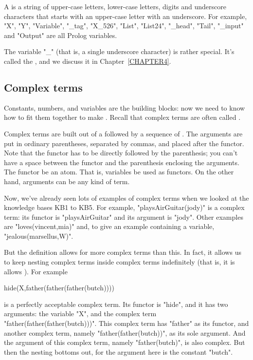 A  is a string of upper-case letters, lower-case letters,
digits and underscore characters that starts  with an
upper-case letter  with an underscore.  For example, "X",
"Y", "Variable", "\_tag", "X\_526",  "List", "List24", "\_head",
"Tail", "\_input" and "Output" are all Prolog variables.

The variable "\_" (that is, a single underscore character) is rather
special.  It's called the , and we discuss
it in Chapter~\ref{CHAPTER4}.



\subsection*{Complex terms}\label{SUBSEC.L1.COMPLEX.TERMS}

Constants, numbers, and variables are the building blocks: now we need
to know how to fit them together to make .
Recall that complex terms are often called .

Complex terms are built out of a  followed by a
sequence of . The arguments are put in ordinary
parentheses, separated by commas, and placed after the functor. Note
that the functor has to be directly followed by the parenthesis; you
can't have a space between the functor and the parenthesis enclosing
the arguments. The functor  be an atom.  That is,
variables  be used as functors.  On the other hand,
arguments can be any kind of term.

Now, we've already seen lots of examples of complex terms when we
looked at the knowledge bases KB1 to KB5. For example,
"playsAirGuitar(jody)" is a complex term: its functor is
"playsAirGuitar" and its argument is "jody".  Other examples are
"loves(vincent,mia)" and, to give an example containing a variable,
"jealous(marsellus,W)".

But  the definition allows for  more complex terms than this.
In fact, it allows us to keep nesting complex terms inside complex
terms indefinitely (that is, it is allows  ).
For example
%
\begin{LPNcodedisplay}
hide(X,father(father(father(butch))))
\end{LPNcodedisplay}
%
is a perfectly acceptable complex term. Its functor is "hide", and it
has two arguments: the variable "X", and the complex term
"father(father(father(butch)))". This complex term has "father" as its
functor, and another complex term, namely "father(father(butch))", as
its sole argument. And the argument of this complex term, namely
"father(butch)", is also complex.  But then the nesting bottoms
out, for the argument here is the constant "butch".


